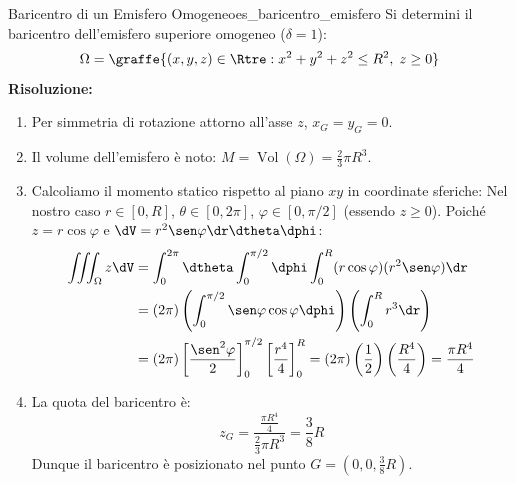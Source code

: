 \begin{esempio}{Baricentro di un Emisfero Omogeneo}{es_baricentro_emisfero}
Si determini il baricentro dell'emisfero superiore omogeneo ($\delta = 1$):
\[
\Omega = \graffe{(x,y,z) \in \Rtre : x^2 + y^2 + z^2 \le R^2, \; z \ge 0}
\]
\textbf{Risoluzione:}
\begin{enumerate}
    \item Per simmetria di rotazione attorno all'asse $z$, $x_G = y_G = 0$.
    \item Il volume dell'emisfero è noto: $M = \operatorname{Vol}(\Omega) = \frac{2}{3}\pi R^3$.
    \item Calcoliamo il momento statico rispetto al piano $xy$ in coordinate sferiche:
    Nel nostro caso $r \in [0, R]$, $\theta \in [0, 2\pi]$, $\varphi \in [0, \pi/2]$ (essendo $z \ge 0$).
    Poiché $z = r\cos\varphi$ e $\dV = r^2\sen\varphi\dr\dtheta\dphi$:
    \begin{align*}
    \iiint_\Omega z \dV &= \int_{0}^{2\pi} \dtheta \int_{0}^{\pi/2} \dphi \int_{0}^{R} (r\cos\varphi)(r^2\sen\varphi) \dr \\
    &= (2\pi) \left( \int_{0}^{\pi/2} \sen\varphi \cos\varphi \dphi \right) \left( \int_{0}^{R} r^3 \dr \right) \\
    &= (2\pi) \left[ \frac{\sen^2\varphi}{2} \right]_0^{\pi/2} \left[ \frac{r^4}{4} \right]_0^R = (2\pi) \left( \frac{1}{2} \right) \left( \frac{R^4}{4} \right) = \frac{\pi R^4}{4}
    \end{align*}
    \item La quota del baricentro è:
    \[
    z_G = \frac{\frac{\pi R^4}{4}}{\frac{2}{3}\pi R^3} = \frac{3}{8} R
    \]
    Dunque il baricentro è posizionato nel punto $G = \left(0, 0, \frac{3}{8}R\right)$.
\end{enumerate}
\end{esempio}
